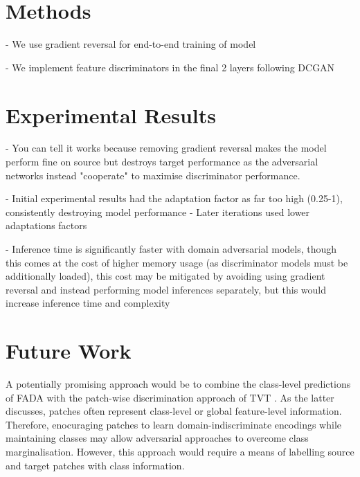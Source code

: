 \documentclass[a4paper,12pt]{report}
\begin{document}

\section{Methods}

- We use gradient reversal for end-to-end training of model

- We implement feature discriminators in the final 2 layers following DCGAN \cite{tsai_learning_2020}

\section{Experimental Results}

- You can tell it works because removing gradient reversal makes the model perform fine on source but destroys target performance as the adversarial networks instead "cooperate" to maximise discriminator performance.

- Initial experimental results had the adaptation factor as far too high (0.25-1), consistently destroying model performance
- Later iterations used lower adaptations factors

- Inference time is significantly faster with domain adversarial models, though this comes at the cost of higher memory usage (as discriminator models must be additionally loaded), this cost may be mitigated by avoiding using gradient reversal and instead performing model inferences separately, but this would increase inference time and complexity



\section{Future Work}
A potentially promising approach would be to combine the class-level predictions of FADA \cite{wang_classes_2020} with the patch-wise discrimination approach of TVT \cite{yang_tvt_2021}. As the latter discusses, patches often represent class-level or global feature-level information. Therefore, enocuraging patches to learn domain-indiscriminate encodings while maintaining classes may allow adversarial approaches to overcome class marginalisation. However, this approach would require a means of labelling source and target patches with class information.

\end{document}
